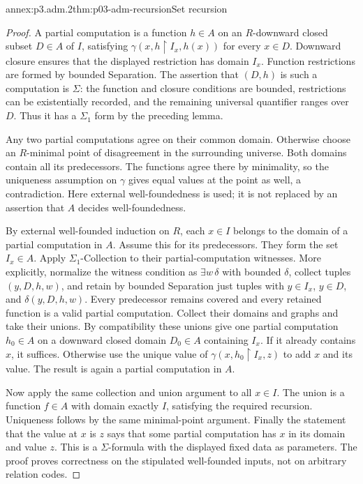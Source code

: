\begin{annexitem}{annex:p3.adm.2}{thm:p03-adm-recursion}{Set recursion}
\begin{proof}
A partial computation is a function \(h\in A\) on an \(R\)-downward
closed subset \(D\in A\) of \(I\), satisfying
\(\gamma(x,h\restriction I_x,h(x))\) for every \(x\in D\).
Downward closure ensures that the displayed restriction has domain
\(I_x\). Function restrictions are formed by bounded Separation.
The assertion that \((D,h)\) is such a computation is \(\Sigma\): the
function and closure conditions are bounded, restrictions can be
existentially recorded, and the remaining universal quantifier ranges
over \(D\). Thus it has a \(\Sigma_1\) form by the preceding lemma.

Any two partial computations agree on their common domain. Otherwise
choose an \(R\)-minimal point of disagreement in the surrounding
universe. Both domains contain all its predecessors. The functions agree
there by minimality, so the uniqueness assumption on \(\gamma\) gives
equal values at the point as well, a contradiction. Here external
well-foundedness is used; it is not replaced by an assertion that \(A\)
decides well-foundedness.

By external well-founded induction on \(R\), each \(x\in I\) belongs
to the domain of a partial computation in \(A\). Assume this for its
predecessors. They form the set \(I_x\in A\). Apply
\(\Sigma_1\)-Collection to their partial-computation witnesses. More
explicitly, normalize the witness condition as \(\exists w\,\delta\)
with bounded \(\delta\), collect tuples \((y,D,h,w)\), and retain by
bounded Separation just tuples with \(y\in I_x\), \(y\in D\), and
\(\delta(y,D,h,w)\). Every predecessor remains covered and every
retained function is a valid partial computation. Collect their domains
and graphs and take their unions. By compatibility these unions give
one partial computation \(h_0\in A\) on a downward closed domain
\(D_0\in A\) containing \(I_x\). If it already contains \(x\), it
suffices. Otherwise use the unique value of
\(\gamma(x,h_0\restriction I_x,z)\) to add \(x\) and its value. The
result is again a partial computation in \(A\).

Now apply the same collection and union argument to all \(x\in I\).
The union is a function \(f\in A\) with domain exactly \(I\), satisfying
the required recursion. Uniqueness follows by the same minimal-point
argument. Finally the statement that the value at \(x\) is \(z\) says
that some partial computation has \(x\) in its domain and value \(z\).
This is a \(\Sigma\)-formula with the displayed fixed data as parameters.
The proof proves correctness on the stipulated well-founded inputs,
not on arbitrary relation codes.
\end{proof}
\end{annexitem}

